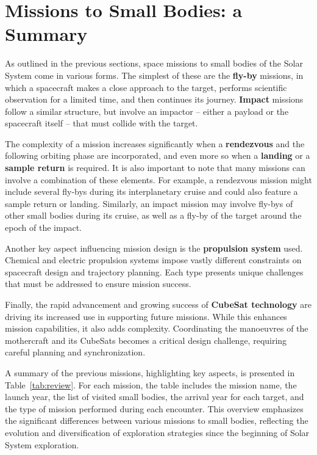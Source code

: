 \documentclass{Configuration_gigi/PoliMi3i_thesis}
\begin{document}
\section{Missions to Small Bodies: a Summary}\label{Sec:Missions to Small Bodies: a Summary}

As outlined in the previous sections, space missions to small bodies of the Solar System come in various forms. The simplest of these are the \textbf{fly-by} missions, in which a spacecraft makes a close approach to the target, performs scientific observation for a limited time, and then continues its journey. \textbf{Impact} missions follow a similar structure, but involve an impactor -- either a payload or the spacecraft itself -- that must collide with the target. 

The complexity of a mission increases significantly when a \textbf{rendezvous} and the following orbiting phase are incorporated, and even more so when a \textbf{landing} or a \textbf{sample return} is required. It is also important to note that many missions can involve a combination of these elements. For example, a rendezvous mission might include several fly-bys during its interplanetary cruise and could also feature a sample return or landing. Similarly, an impact mission may involve fly-bys of other small bodies during its cruise, as well as a fly-by of the target around the epoch of the impact. 

Another key aspect influencing mission design is the \textbf{propulsion system} used. Chemical and electric propulsion systems impose vastly different constraints on spacecraft design and trajectory planning. Each type presents unique challenges that must be addressed to ensure mission success.

Finally, the rapid advancement and growing success of \textbf{CubeSat technology} are driving its increased use in supporting future missions. While this enhances mission capabilities, it also adds complexity. Coordinating the manoeuvres of the mothercraft and its CubeSats becomes a critical design challenge, requiring careful planning and synchronization.

A summary of the previous missions, highlighting key aspects, is presented in Table~\ref{tab:review}. For each mission, the table includes the mission name, the launch year, the list of visited small bodies, the arrival year for each target, and the type of mission performed during each encounter. This overview emphasizes the significant differences between various missions to small bodies, reflecting the evolution and diversification of exploration strategies since the beginning of Solar System exploration.
\end{document}

